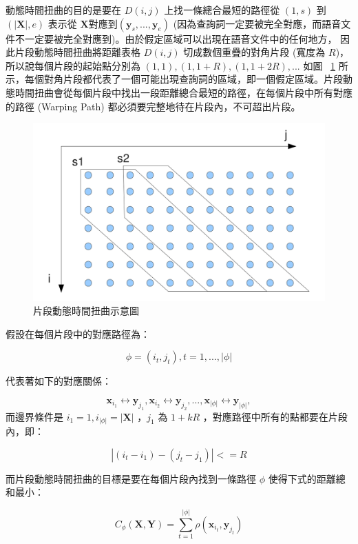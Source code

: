 動態時間扭曲的目的是要在 $D(i, j)$ 上找一條總合最短的路徑從 $(1, s)$ 到 $(|\mathbf{X}|, e)$ 表示從 $\mathbf{X}$對應到$(\mathbf{y}_s, ..., \mathbf{y}_e)$ (因為查詢詞一定要被完全對應，而語音文件不一定要被完全對應到)。由於假定區域可以出現在語音文件中的任何地方， 因此片段動態時間扭曲將距離表格 $D(i, j)$ 切成數個重疊的對角片段 (寬度為 $R$)，所以說每個片段的起始點分別為 $(1, 1), (1, 1+R), (1, 1+2R),...$ 如圖 ~\ref{fig:chap4_sdtw} 所示，每個對角片段都代表了一個可能出現查詢詞的區域，即一個假定區域。片段動態時間扭曲會從每個片段中找出一段距離總合最短的路徑，在每個片段中所有對應的路徑 (Warping Path) 都必須要完整地待在片段內，不可超出片段。

\begin{figure}
\centering
\includegraphics[scale=0.3]{images/chap4_sdtw.png}
\caption{片段動態時間扭曲示意圖~\cite{zhang2009unsupervised}} \label{fig:chap4_sdtw}
\end{figure}

假設在每個片段中的對應路徑為：

\[
\phi = (i_t, j_t), t = 1,...,|\phi|
\]

代表著如下的對應關係：

\[
\mathbf{x}_{i_1} \leftrightarrow \mathbf{y}_{j_1}, \mathbf{x}_{i_2} \leftrightarrow \mathbf{y}_{j_2},...,\mathbf{x}_{|\phi|} \leftrightarrow \mathbf{y}_{|\phi|},
\]
而邊界條件是 $i_1 = 1, i_{|\phi|} = |\mathbf{X}|$ ，$j_1$ 為 $1+kR$ ，對應路徑中所有的點都要在片段內，即：

\[
|(i_t-i_1)-(j_t-j_1)| <= R
\]

而片段動態時間扭曲的目標是要在每個片段內找到一條路徑 $\phi$ 使得下式的距離總和最小：

\begin{equation}
C_{\phi}(\mathbf{X}, \mathbf{Y}) = \sum_{t=1}^{|\phi|} \rho(\mathbf{x}_{i_t},\mathbf{y}_{j_t})
\end{equation}

